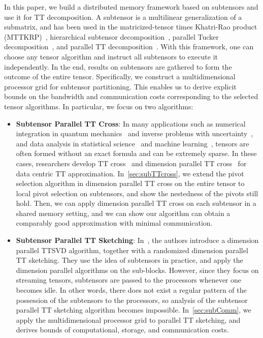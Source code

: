 \documentclass[11pt,a4paper,review]{siamart220329}
\begin{document}
In this paper, we build a distributed memory framework based on subtensors and use it for TT decomposition. A subtensor is a multilinear generalization of a submatrix, and has been used in the matricized-tensor times Khatri-Rao product (MTTKRP)~\cite{ballard2018, ballard2020}, hierarchical subtensor decomposition~\cite{ehrlacher2021}, parallel Tucker decomposition~\cite{ballard2020tuckermpi}, and parallel TT decomposition~\cite{shi2023parallel}. With this framework, one can choose any tensor algorithm and instruct all subtensors to execute it independently. In the end, results on subtensors are gathered to form the outcome of the entire tensor. Specifically, we construct a multidimensional processor grid for subtensor partitioning. This enables us to derive explicit bounds on the bandwidth and communication costs corresponding to the selected tensor algorithms. In particular, we focus on two algorithms:
\begin{itemize}[leftmargin=*,noitemsep]
\item \textbf{Subtensor Parallel TT Cross}: In many applications such as numerical integration in quantum mechanics~\cite{meyer1990multi} and inverse problems with uncertainty~\cite{stuart2010inverse}, and data analysis in statistical science~\cite{mccullagh2018tensor} and machine learning~\cite{rabanser2017introduction}, tensors are often formed without an exact formula and can be extremely sparse. In these cases, researchers develop TT cross~\cite{oseledets2010tt} and dimension parallel TT cross~\cite{dolgov2020parallel} for data centric TT approximation. In~\cref{sec:subTTcross}, we extend the pivot selection algorithm in dimension parallel TT cross on the entire tensor to local pivot selection on subtensors, and show the nestedness of the pivots still hold. Then, we can apply dimension parallel TT cross on each subtensor in a shared memory setting, and we can show our algorithm can obtain a comparably good approximation with minimal communication.

\item \textbf{Subtensor Parallel TT Sketching}: In~\cite{shi2023parallel}, the authors introduce a dimension parallel TTSVD algorithm, together with a randomized dimension parallel TT sketching. They use the idea of subtensors in practice, and apply the dimension parallel algorithms on the sub-blocks. However, since they focus on streaming tensors, subtensors are passed to the processors whenever one becomes idle. In other words, there does not exist a regular pattern of the possession of the subtensors to the processors, so analysis of the subtensor parallel TT sketching algorithm becomes impossible. In~\cref{sec:subComm}, we apply the multidimensional processor grid to parallel TT sketching, and derives bounds of computational, storage, and communication costs.
\end{itemize}
\end{document}
